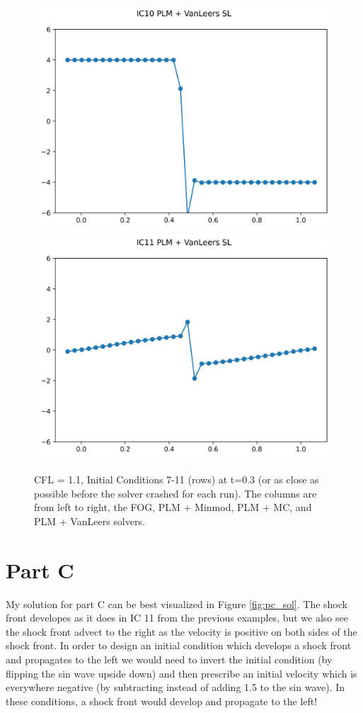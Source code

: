 \documentclass{article}
\begin{document}
\begin{figure}[t]
        \includegraphics[width=.95\textwidth]{../../code/unsafe_IC10Methodpv_plot.png}
        \includegraphics[width=.95\textwidth]{../../code/unsafe_IC11Methodpv_plot.png}
    \emp
    \caption{CFL = 1.1, Initial Conditions 7-11 (rows) at t=0.3 (or as close as possible before the
    solver crashed for each run). The columns are from left to right, the FOG,
    PLM + Minmod, PLM + MC, and PLM + VanLeers solvers.}
    \label{fig:unsafe_sol_7_11}
\end{figure}


\section{Part C}

My solution for part C can be best visualized in Figure \ref{fig:pc_sol}. The
shock front developes as it does in IC 11 from the previous examples, but we
also see the shock front advect to the right as the velocity is positive on both
sides of the shock front. In order to design an initial condition which develops
a shock front and propagates to the left we would need to invert the initial
condition (by flipping the sin wave upside down) and then prescribe an initial
velocity which is everywhere negative (by subtracting instead of adding 1.5 to
the sin wave). In these conditions, a shock front would develop and propagate to
the left!
\end{document}
